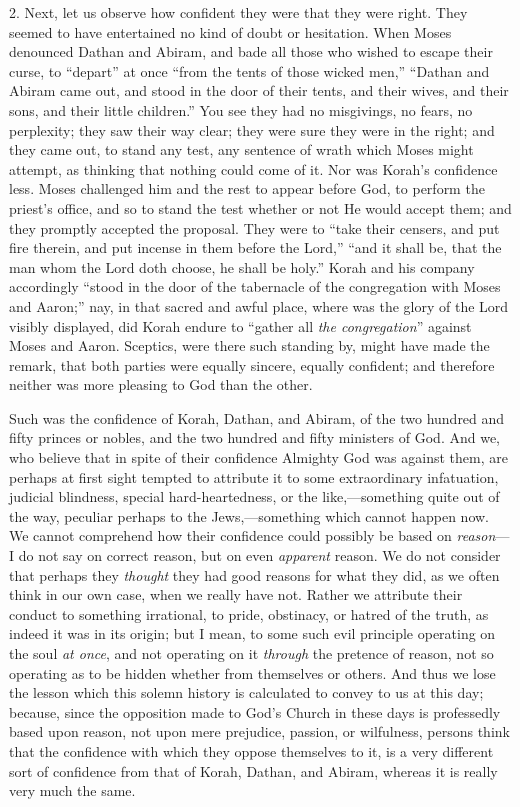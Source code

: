 2. Next, let us observe how confident they were that they were
right. They seemed to have entertained no kind of doubt or hesitation.
When Moses denounced Dathan and Abiram, and bade all those who wished
to escape their curse, to ``depart'' at once ``from the
tents of those wicked men,'' ``Dathan and Abiram came out, and
stood in the door of their tents, and their wives, and their sons, and
their little children.'' You see they had no misgivings, no fears,
no perplexity; they saw their way clear; they were sure they were in
the right; and they came out, to stand any test, any sentence of wrath
which Moses might attempt, as thinking that nothing could come of it.
Nor was Korah's confidence less. Moses challenged him and the rest to
appear before God, to perform the priest's office, and so to stand the
test whether or not He would accept them; and they promptly accepted
the proposal. They were to ``take their censers, and put fire
therein, and put incense in them before the Lord,'' ``and it
shall be, that the man whom the Lord doth choose, he shall be
holy.'' Korah and his company accordingly ``stood in the door
of the tabernacle of the congregation with Moses and Aaron;'' nay,
in that sacred and awful place, where was the glory of the Lord
visibly displayed, did Korah endure to ``gather all \emph{the
congregation}'' against Moses and Aaron. Sceptics, were there
such standing by, might have made the remark, that both parties were
equally sincere, equally confident; and therefore neither was more
pleasing to God than the other.

Such was the confidence of Korah, Dathan, and Abiram, of the two
hundred and fifty princes or nobles, and the two hundred and fifty
ministers of God. And we, who believe that in spite of their
confidence Almighty God was against them, are perhaps at first sight
tempted to attribute it to some extraordinary infatuation, judicial
blindness, special hard-heartedness, or the like,—something quite
out of the way, peculiar perhaps to the Jews,—something which cannot
happen now. We cannot comprehend how their confidence could possibly
be based on \emph{reason}—I do not say on correct reason, but on even \emph{apparent}
reason. We do not consider that perhaps they \emph{thought} they had
good reasons for what they did, as we often think in our own case,
when we really have not. Rather we attribute their conduct to
something irrational, to pride, obstinacy, or hatred of the truth, as
indeed it was in its origin; but I mean, to some such evil principle
operating on the soul \emph{at once}, and not operating on it \emph{through}
the pretence of reason, not so operating as to be hidden whether from
themselves or others. And thus we lose the lesson which this solemn
history is calculated to convey to us at this day; because, since the
opposition made to God's Church in these days is professedly based
upon reason, not upon mere prejudice, passion, or wilfulness, persons
think that the confidence with which they oppose themselves to it, is
a very different sort of confidence from that of Korah, Dathan, and
Abiram, whereas it is really very much the same.

